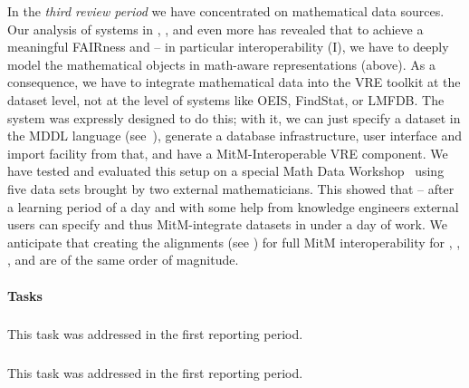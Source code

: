 In the \emph{third review period} we have concentrated on mathematical data sources.
Our analysis of systems in , , and even more  has revealed that to achieve a meaningful FAIRness  and  -- in particular interoperability (I), we have to deeply model the mathematical objects in math-aware representations (above).
As a consequence, we have to integrate mathematical data into the \pn VRE toolkit at the dataset level, not at the level of systems like OEIS, FindStat, or LMFDB.
The \dmh system was expressly designed to do this; with it, we can just specify a dataset in the MDDL language (see~\cite{BerKohRab:tumdi19,ODK-D6.10}), generate a database infrastructure, user interface and import facility from that, and have a MitM-Interoperable  VRE component.
We have tested and evaluated this setup on a special Math Data Workshop~\cite{ODK-WDM19} using five data sets brought by two external mathematicians.
This showed that -- after a learning period of a day and with some help from \pn knowledge engineers external users can specify and thus MitM-integrate datasets in under a day of work.
We anticipate that creating the alignments (see \cite{ODK-D6.5}) for full MitM interoperability for \GAP, \Sage, \Singular, and \LMFDB are of the same order of magnitude. 


\paragraph{Tasks}
\medskip

\subparagraph{}
\label{dksbases@data-assessment}
This task was addressed in the first reporting period.
\medskip

\subparagraph{}
\label{dksbases@data-triform}
This task was addressed in the first reporting period.
\medskip

